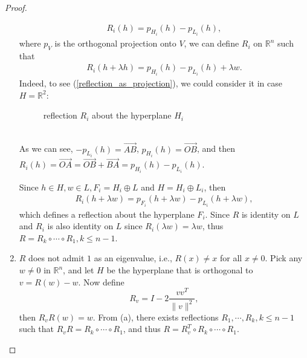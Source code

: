 \documentclass[11pt]{book}
\theoremstyle{definition}
\numberwithin{equation}{chapter}
\begin{document}
\begin{subappendices}
\begin{proof}
\begin{enumerate}[label=(\alph*)]
    \begin{align}\label{reflection_as_projection}
        R_i(h) = p_{H_i}(h) - p_{L_i}(h),
    \end{align}
    where $p_{V}$ is the orthogonal projection onto $V$, we can define $R_i$ on $\mathbb{R}^n$ such that 
    \begin{align*}
        R_i(h + \lambda h) = p_{H_i}(h) - p_{L_i}(h) + \lambda w.
    \end{align*}
    Indeed, to see (\ref{reflection_as_projection}), we could consider it in case $H = \mathbb{R}^2$:\\
    \begin{figure}[h]
        \centering
        \caption{reflection $R_i$ about the hyperplane $H_i$}
        \label{fig:plot_2}
    \end{figure}\\
    As we can see, $- p_{L_i}(h) = \overrightarrow{AB}$, $p_{H_i}(h) = \overrightarrow{OB}$, and then $R_i(h) = \overrightarrow{OA} = \overrightarrow{OB} + \overrightarrow{BA} = p_{H_i}(h) - p_{L_i}(h)$.
    
    Since $h \in H, w \in L, F_i = H_i \oplus L$ and $H = H_i \oplus L_i$, then
    \begin{align*}
        R_i(h + \lambda w) = p_{F_i}(h + \lambda w) - p_{L_i}(h + \lambda w), 
    \end{align*}
    which defines a reflection about the hyperplane $F_i$. Since $R$ is identity on $L$ and $R_i$ is also identity on $L$ since $R_i(\lambda w) = \lambda w$, thus $R = R_k \circ \cdots \circ R_1, k \leq n - 1$.
    
    \item $R$ does not admit $1$ as an eigenvalue, i.e., $R(x) \neq x$ for all $x \neq 0$. Pick any $w \neq 0$ in $\mathbb{R}^n$, and let $H$ be the hyperplane that is orthogonal to $v = R(w) - w$. Now define 
    $$R_v = I - 2 \frac{vv^T}{\|v\|^2},$$ 
    then $R_v R (w) = w$. From (a), there exists reflections $R_1, \cdots, R_k, k \leq n - 1$ such that $R_v R = R_k \circ \cdots \circ R_1$, and thus $R = R_v^T \circ R_k \circ \cdots \circ R_1$. 
\end{enumerate}
\end{proof}



\end{subappendices}
\end{document}
